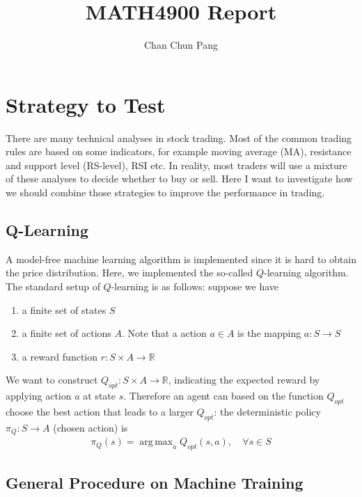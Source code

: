 \documentclass[11pt,a4paper]{article}
\author{Chan Chun Pang}
\title{MATH4900 Report}
\numberwithin{equation}{section}
\newcommand{\R}{\mathbb{R}}
\DeclareMathOperator*{\argmax}{arg\,max}
\begin{document}
\maketitle

\section{Strategy to Test}

There are many technical analyses in stock trading. Most of the common trading rules are based on some indicators, for example moving average (MA), resistance and support level (RS-level), RSI etc. In reality, most traders will use a mixture of these analyses to decide whether to buy or sell. Here I want to investigate how we should combine those strategies to improve the performance in trading.

\subsection{Q-Learning}

A model-free machine learning algorithm is implemented since it is hard to obtain the price distribution. Here, we implemented the so-called $Q$-learning algorithm. \\

The standard setup of $Q$-learning is as follows: suppose we have
\begin{enumerate}
  \item a finite set of states $S$
  \item a finite set of actions $A$. Note that a action $a \in A$ is the mapping $a: S \to S$
  \item a reward function $r: S \times A \to \R$
\end{enumerate}

We want to construct $Q_{opt}: S \times A \to \R$, indicating the expected reward by applying action $a$ at state $s$. Therefore an agent can based on the function $Q_{opt}$ choose the best action that leads to a larger $Q_{opt}$: the deterministic policy $\pi_Q: S \to A$ (chosen action) is
\begin{align}
  \pi_Q (s) = \argmax_a Q_{opt} (s, a), \quad \forall s \in S
\end{align}

\subsection{General Procedure on Machine Training}
\end{document}
